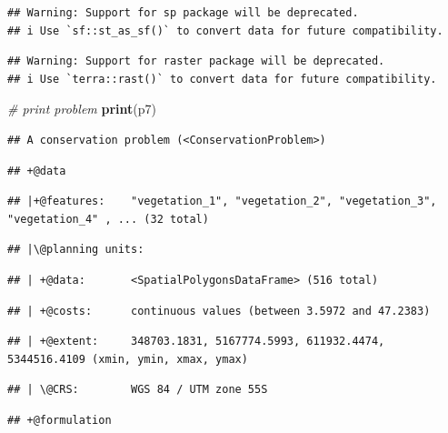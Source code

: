 \documentclass[12pt,]{book}
\newenvironment{Shaded}{\begin{snugshade}}{\end{snugshade}}
\newcommand{\CommentTok}[1]{\textcolor[rgb]{0.56,0.35,0.01}{\textit{#1}}}
\newcommand{\KeywordTok}[1]{\textcolor[rgb]{0.13,0.29,0.53}{\textbf{#1}}}
\newcommand{\NormalTok}[1]{#1}
\begin{document}
\begin{verbatim}
## Warning: Support for sp package will be deprecated.
## i Use `sf::st_as_sf()` to convert data for future compatibility.
\end{verbatim}

\begin{verbatim}
## Warning: Support for raster package will be deprecated.
## i Use `terra::rast()` to convert data for future compatibility.
\end{verbatim}

\begin{Shaded}
\begin{Highlighting}[]
\CommentTok{# print problem}
\KeywordTok{print}\NormalTok{(p7)}
\end{Highlighting}
\end{Shaded}

\begin{verbatim}
## A conservation problem (<ConservationProblem>)
\end{verbatim}

\begin{verbatim}
## +@data
\end{verbatim}

\begin{verbatim}
## |+@features:    "vegetation_1", "vegetation_2", "vegetation_3", "vegetation_4" , ... (32 total)
\end{verbatim}

\begin{verbatim}
## |\@planning units:
\end{verbatim}

\begin{verbatim}
## | +@data:       <SpatialPolygonsDataFrame> (516 total)
\end{verbatim}

\begin{verbatim}
## | +@costs:      continuous values (between 3.5972 and 47.2383)
\end{verbatim}

\begin{verbatim}
## | +@extent:     348703.1831, 5167774.5993, 611932.4474, 5344516.4109 (xmin, ymin, xmax, ymax)
\end{verbatim}

\begin{verbatim}
## | \@CRS:        WGS 84 / UTM zone 55S
\end{verbatim}

\begin{verbatim}
## +@formulation
\end{verbatim}
\end{document}
